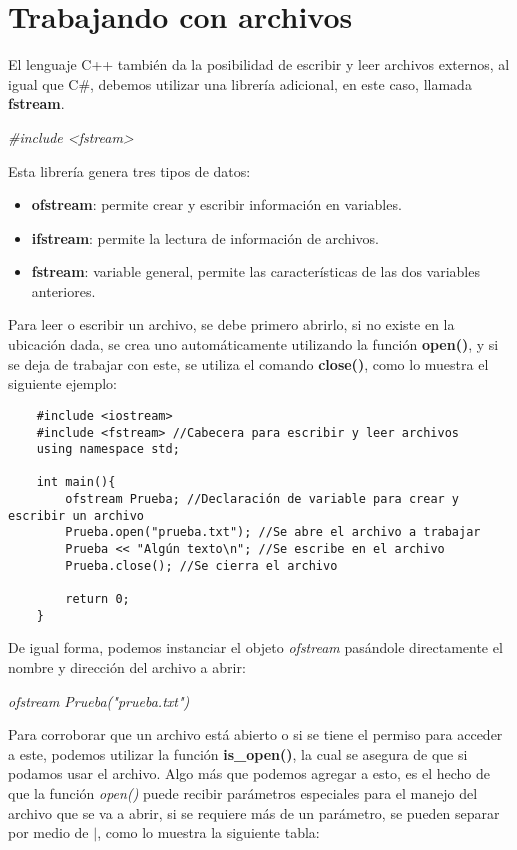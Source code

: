 \section{Trabajando con archivos}
El lenguaje C++ también da la posibilidad de escribir y leer archivos externos, al igual que C\#, debemos utilizar una librería adicional, en este caso, llamada \textbf{fstream}.\begin{center}\textit{\#include <fstream>}\end{center}
Esta librería genera tres tipos de datos:
\begin{itemize}
    \item \textbf{ofstream}: permite crear y escribir información en variables.
    \item \textbf{ifstream}: permite la lectura de información de archivos.
    \item \textbf{fstream}: variable general, permite las características de las dos variables anteriores.
\end{itemize}
Para leer o escribir un archivo, se debe primero abrirlo, si no existe en la ubicación dada, se crea uno automáticamente utilizando la función \textbf{open()}, y si se deja de trabajar con este, se utiliza el comando \textbf{close()}, como lo muestra el siguiente ejemplo:
\begin{lstlisting}
    #include <iostream>
    #include <fstream> //Cabecera para escribir y leer archivos
    using namespace std;
    
    int main(){
        ofstream Prueba; //Declaración de variable para crear y escribir un archivo
        Prueba.open("prueba.txt"); //Se abre el archivo a trabajar
        Prueba << "Algún texto\n"; //Se escribe en el archivo
        Prueba.close(); //Se cierra el archivo
        
        return 0;
    }
\end{lstlisting}
De igual forma, podemos instanciar el objeto \textit{ofstream} pasándole directamente el nombre y dirección del archivo a abrir:\begin{center}\textit{ofstream Prueba("prueba.txt")}\end{center}
Para corroborar que un archivo está abierto o si se tiene el permiso para acceder a este, podemos utilizar la función \textbf{is\_open()}, la cual se asegura de que si podamos usar el archivo. Algo más que podemos agregar a esto, es el hecho de que la función \textit{open()} puede recibir parámetros especiales para el manejo del archivo que se va a abrir, si se requiere más de un parámetro, se pueden separar por medio de $|$, como lo muestra la siguiente tabla:
